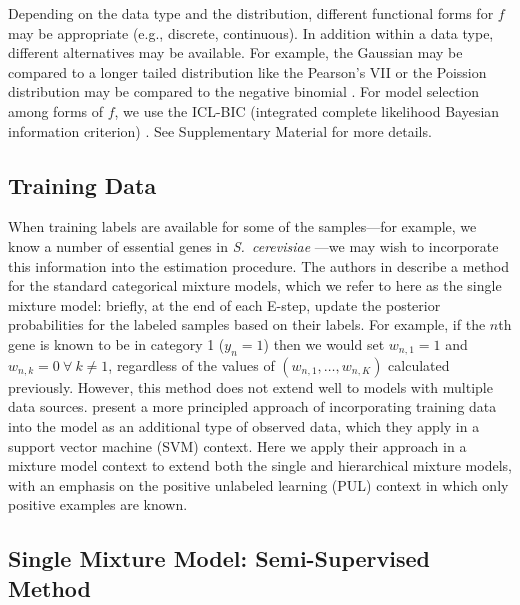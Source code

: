 \documentclass{bmcart}
\begin{document}
Depending on the data type and the distribution, different functional forms for $f$ may be appropriate (e.g., discrete, continuous). In addition within a data type, different alternatives may be available.  For example, 
the Gaussian may be compared to a longer tailed distribution like the Pearson's VII or the Poission distribution may be 
compared to the negative binomial \citep{Dvorkin2013b}. For model selection among forms of $f$, we use the ICL-BIC (integrated complete likelihood Bayesian information 
criterion) \citep{Biernacki2000a}.  See Supplementary Material for more details.

\subsection*{Training Data}

When training labels are available for some of the samples---for example, we know a number of essential genes in \textit{S.\ cerevisiae} ---we may wish to incorporate this information into the estimation procedure.   The authors in \citep{Alexandridis2004a} describe a method for the standard categorical mixture models, which we refer to here as the single mixture model:  briefly, at the end of each E-step, update the posterior probabilities for the labeled samples based on their labels.  For example, if the $n$th gene is known to be in category 1 ($y_n = 1$) then we would set $w_{n,1} = 1$ and $w_{n,k} = 0 \ \forall \ k \neq 1$, regardless of the values of $(w_{n, 1}, \ldots, w_{n,K})$ calculated previously.  However, this method  does not extend well to models with multiple data sources.  \citep{Elkan2008a} present a more principled approach of incorporating training data into the model as an additional type of observed data, which they apply in a support vector machine (SVM) context.  Here we apply their approach in a mixture model context to extend both the single and hierarchical mixture models, with an emphasis on the positive unlabeled learning (PUL) context in which only positive examples are known.

\subsection*{Single Mixture Model: Semi-Supervised Method}\label{subsec:methods.semisup.marginal}
\end{document}
